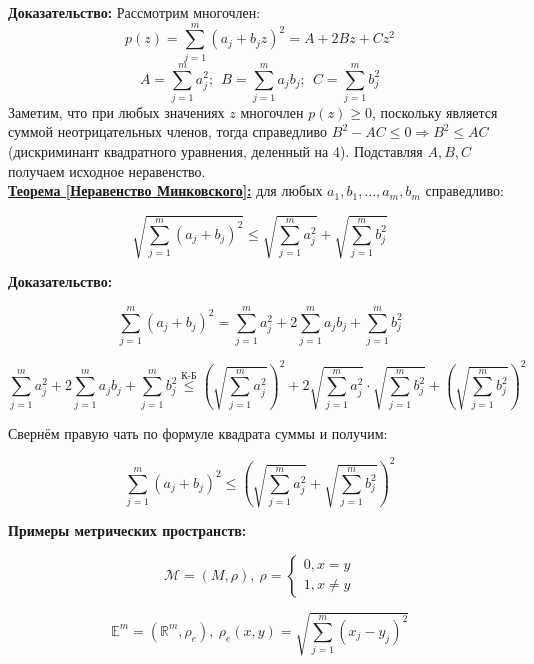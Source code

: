 \documentclass[a4paper,12pt]{article} %
\begin{document}
	\textbf{Доказательство:} Рассмотрим многочлен:
	\[ p(z) = \sum\limits_{j = 1}^{m} (a_j + b_j z)^2 = A + 2Bz + Cz^2 \]
	\[ A = \sum\limits_{j = 1}^{m} a_j^2; ~~ B = \sum\limits_{j = 1}^{m} a_j b_j; ~~ C = \sum\limits_{j = 1}^{m} b_j^2 \]
	Заметим, что при любых значениях $z$ многочлен $p(z) \geqslant 0$, поскольку является суммой неотрицательных членов, тогда справедливо $B^2 - AC \leqslant 0 \Rightarrow B^2 \leqslant AC$ (дискриминант квадратного уравнения, деленный на 4). Подставляя $A, B, C$ получаем исходное неравенство.\\
	
	\underline{\textbf{Теорема [Неравенство Минковского]:}} для любых $a_1, b_1, \dots, a_m, b_m$ справедливо:
	
	\begin{equation*}
		\sqrt{\sum\limits_{j = 1}^{m} (a_j + b_j)^2} \leqslant \sqrt{\sum\limits_{j = 1}^{m} a_j^2} + \sqrt{\sum\limits_{j = 1}^{m} b_j^2}
	\end{equation*}
	
	\textbf{Доказательство:} 
	
	\[ \sum\limits_{j = 1}^{m} (a_j + b_j)^2 = \sum\limits_{j = 1}^{m} a_j^2 + 2\sum\limits_{j = 1}^{m} a_j b_j + \sum\limits_{j = 1}^{m} b_j^2 \]
	
	\[ \sum\limits_{j = 1}^{m} a_j^2 + 2\sum\limits_{j = 1}^{m} a_j b_j + \sum\limits_{j = 1}^{m} b_j^2 \stackrel{\text{К-Б}}{\leqslant} \left( \sqrt{\sum\limits_{j = 1}^{m} a_j^2} \right)^2 + 2\sqrt{\sum\limits_{j = 1}^{m} a_j^2} \cdot \sqrt{\sum\limits_{j = 1}^{m} b_j^2} + \left( \sqrt{\sum\limits_{j = 1}^{m} b_j^2} \right)^2 \]
	
	Свернём правую чать по формуле квадрата суммы и получим:
	
	\[ \sum\limits_{j = 1}^{m} (a_j + b_j)^2 \leqslant \left( \sqrt{\sum\limits_{j = 1}^{m} a_j^2} + \sqrt{\sum\limits_{j = 1}^{m} b_j^2} \right)^2 \]
	
	\textbf{Примеры метрических пространств:}
	
	\begin{equation*}
		\mathscr{M} = (M, \rho), ~ \rho = 
		\begin{cases}
			0, x = y\\
			1, x \neq y
		\end{cases}
	\end{equation*}
	
	\begin{equation*}
		\mathbb{E}^m = (\mathbb{R}^m, \rho_e), ~ \rho_e(x, y) = \sqrt{\sum\limits_{j = 1}^m (x_j - y_j)^2}
	\end{equation*}
	
\end{document}
